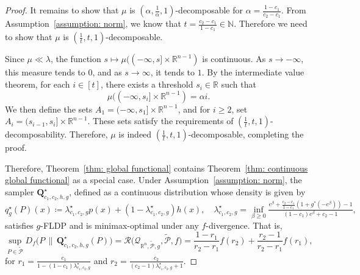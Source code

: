 \documentclass[accepted]{article}
\theoremstyle{plain} %
\theoremstyle{definition}
\theoremstyle{remark}
\newcommand{\bQ}{\mathbf{Q}}
\begin{document}
\begin{proof}
It remains to show that \( \mu \) is \( \left(\alpha, \frac{1}{\alpha}, 1\right) \)-decomposable for \( \alpha = \frac{1 - c_1}{c_2 - c_1} \). From Assumption~\ref{assumption: norm}, we know that \( t = \frac{c_2 - c_1}{1 - c_1} \in \mathbb{N} \).  Therefore we need to show that  \( \mu \) is \( \left(\frac{1}{t}, t, 1\right) \)-decomposable.

Since \( \mu \ll \lambda \), the function \( s \mapsto \mu((-\infty, s] \times \mathbb{R}^{n-1}) \) is continuous. As \( s \to -\infty \), this measure tends to \( 0 \), and as \( s \to \infty \), it tends to \( 1 \). By the intermediate value theorem, for each \( i \in [t] \), there exists a threshold \( s_i \in \mathbb{R} \) such that
\[
\mu((-\infty, s_i] \times \mathbb{R}^{n-1}) = \alpha i.
\]
We then define the sets \( A_1 = (-\infty, s_1] \times \mathbb{R}^{n-1} \), and for \( i \geq 2 \), set \( A_i = (s_{i-1}, s_i] \times \mathbb{R}^{n-1} \). These sets satisfy the requirements of \( \left(\frac{1}{t}, t, 1\right) \)-decomposability. Therefore, \( \mu \) is indeed \( \left(\frac{1}{t}, t, 1\right) \)-decomposable, completing the proof.

Therefore, Theorem~\ref{thm: global functional} contains Theorem~\ref{thm: continuous global functional} as a special case. Under Assumption~\ref{assumption: norm}, the sampler \( \mathbf{Q}_{c_1,c_2,h,g}^\star \), defined as a continuous distribution whose density is given by
\begin{equation}
   q^\star_g(P)(x) \coloneqq \lambda^\star_{c_1,c_2,g} p(x) + \left(1 - \lambda^\star_{c_1,c_2,g}\right) h(x), \quad \lambda^\star_{c_1,c_2,g} = \inf_{\beta \geq 0} 
\tfrac{e^\beta + \frac{c_2 - c_1}{1 - c_1} ( 1 + g^*(-e^\beta)) - 1}
     {(1 - c_1)e^\beta + c_2 - 1},
\end{equation}
satisfies \( g \)-FLDP and is minimax-optimal under any \( f \)-divergence. That is,
\begin{equation*}
    \sup_{P \in \tilde{\mathcal{P}}} D_f\big(P \,\|\, \bQ^\star_{c_1,c_2,h,g}(P)\big)
    = \mathcal{R}\big(\mathcal{Q}_{\mathbb{R}^n, \tilde{\mathcal{P}}, g}, \tilde{\mathcal{P}}, f\big)
    = \frac{1 - r_1}{r_2 - r_1} f(r_2) + \frac{r_2 - 1}{r_2 - r_1} f(r_1),
\end{equation*}
for $r_1=\frac{c_1}{1-(1-c_1)\lambda_{c_1,c_2,g}^\star}$ and $r_2=\frac{c_2}{(c_2-1)\lambda_{c_1,c_2,g}^\star+1}$.
\end{proof}
\end{document}
